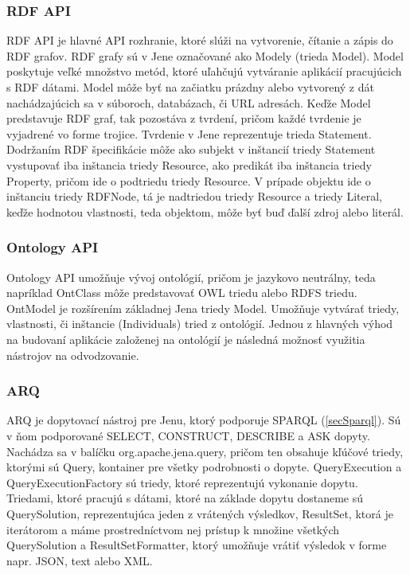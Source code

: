 \subsubsection{RDF API}
RDF API je hlavné API rozhranie, ktoré slúži na vytvorenie, čítanie a zápis do RDF grafov. RDF grafy sú v Jene označované ako Modely (trieda Model). Model poskytuje veľké množstvo metód, ktoré uľahčujú vytváranie aplikácií pracujúcich s RDF dátami. Model môže byť na začiatku prázdny alebo vytvorený z dát nachádzajúcich sa v súboroch, databázach, či URL adresách. Keďže Model predstavuje RDF graf, tak pozostáva z tvrdení, pričom každé tvrdenie je vyjadrené vo forme trojice. Tvrdenie v Jene reprezentuje trieda Statement. Dodržaním RDF špecifikácie môže ako subjekt v inštancií triedy Statement vystupovať iba inštancia triedy Resource, ako predikát iba inštancia triedy Property, pričom ide o podtriedu triedy Resource. V prípade objektu ide o inštanciu triedy RDFNode, tá je nadtriedou triedy Resource a triedy Literal, keďže hodnotou vlastnosti, teda objektom, môže byť buď ďalší zdroj alebo literál. 

\subsubsection{Ontology API}
Ontology API umožňuje vývoj ontológií, pričom je jazykovo neutrálny, teda napríklad OntClass môže predstavovať OWL  triedu alebo RDFS triedu. OntModel je rozšírením základnej Jena triedy Model. Umožňuje vytvárať triedy, vlastnosti, či inštancie (Individuals) tried z ontológií. Jednou z hlavných výhod na budovaní aplikácie založenej na ontológií je následná možnosť využitia nástrojov na odvodzovanie.

\subsubsection{ARQ}
ARQ je dopytovací nástroj pre Jenu, ktorý podporuje SPARQL ({\ref{secSparql}}). Sú v ňom podporované SELECT, CONSTRUCT, DESCRIBE a ASK dopyty. Nachádza sa v balíčku org.apache.jena.query, pričom ten obsahuje kľúčové triedy, ktorými sú Query, kontainer pre všetky podrobnosti o dopyte.  QueryExecution a QueryExecutionFactory sú triedy, ktoré reprezentujú vykonanie dopytu. Triedami, ktoré pracujú s dátami, ktoré na základe dopytu dostaneme sú QuerySolution, reprezentujúca jeden z vrátených výsledkov, ResultSet, ktorá je iterátorom a máme prostredníctvom nej prístup k množine všetkých QuerySolution a ResultSetFormatter, ktorý umožňuje vrátiť výsledok v forme napr. JSON, text alebo XML. 

